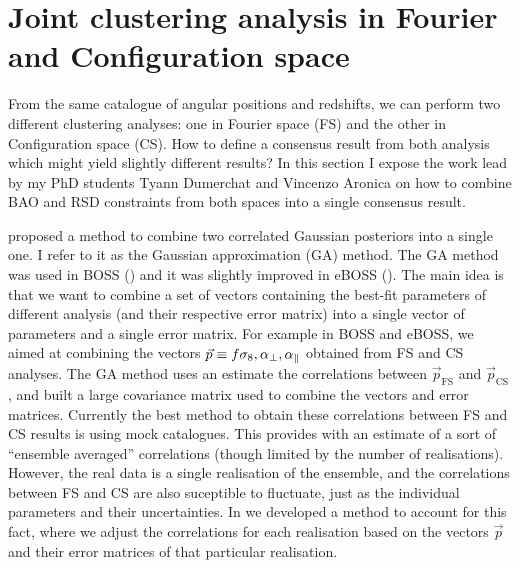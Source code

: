 \section{Joint clustering analysis in Fourier and Configuration space}
\label{galaxies:joint}

From the same catalogue of angular positions and redshifts, we can perform 
two different clustering analyses: one in Fourier space (FS) and the other in 
Configuration space (CS). How to define a consensus result from both analysis 
which might yield slightly different results? In this section I expose the work 
lead by my PhD students Tyann Dumerchat and Vincenzo Aronica on how to combine  
BAO and RSD constraints from both spaces into a single consensus result. 

\cite{sanchezClusteringGalaxiesCompleted2017a} proposed a method to combine
two correlated Gaussian posteriors into a single one. I refer to it as the 
Gaussian approximation (GA) method. The GA method was used in 
BOSS (\cite{alamClusteringGalaxiesCompleted2017}) and it was slightly improved 
in eBOSS (\cite{bautistaCompletedSDSSIVExtended2021}). 
The main idea is that we want to combine a set of vectors containing the best-fit 
parameters of different analysis (and their respective error matrix) into a single vector 
of parameters and a single error matrix. 
For example in BOSS and eBOSS, we aimed at combining 
the vectors $\vec{p} \equiv {f\sigma_8, {\alpha_\perp}, {\alpha_\parallel}}$ obtained from FS and CS analyses. 
The GA method uses an estimate the correlations between $\vec{p}_\text{FS}$ and $\vec{p}_\text{CS}$,
and built a large covariance matrix used to combine the vectors and error matrices. 
Currently the best method to obtain these correlations between FS and CS results is using mock catalogues.
This provides with an estimate of a sort of ``ensemble averaged'' correlations (though limited by the 
number of realisations). However, the real data is a single realisation of the ensemble, and 
the correlations between FS and CS are also suceptible to fluctuate, just as the individual parameters 
and their uncertainties. In \cite{bautistaCompletedSDSSIVExtended2021} we developed 
a method to account for this fact, where we adjust the correlations for each realisation based on 
the vectors $\vec{p}$ and their error matrices of that particular realisation. 

